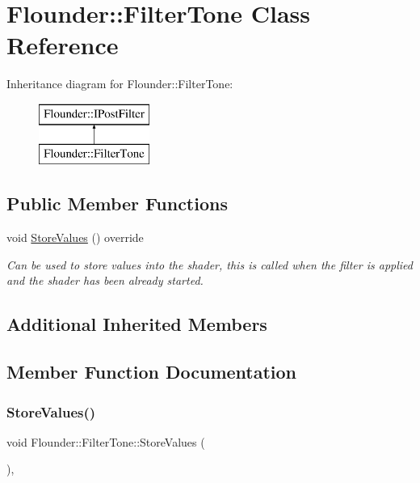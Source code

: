 \hypertarget{class_flounder_1_1_filter_tone}{}\section{Flounder\+:\+:Filter\+Tone Class Reference}
\label{class_flounder_1_1_filter_tone}
Inheritance diagram for Flounder\+:\+:Filter\+Tone\+:\begin{figure}[H]
\begin{center}
\leavevmode
\includegraphics[height=2.000000cm]{class_flounder_1_1_filter_tone}
\end{center}
\end{figure}
\subsection*{Public Member Functions}
\begin{DoxyCompactItemize}
\item 
void \hyperlink{class_flounder_1_1_filter_tone_a384b8c2fd7605bc0cc04be7be9d3eb68}{Store\+Values} () override
\begin{DoxyCompactList}\small\item\em Can be used to store values into the shader, this is called when the filter is applied and the shader has been already started. \end{DoxyCompactList}\end{DoxyCompactItemize}
\subsection*{Additional Inherited Members}


\subsection{Member Function Documentation}
\mbox{\label{class_flounder_1_1_filter_tone_a384b8c2fd7605bc0cc04be7be9d3eb68}} 
\subsubsection{\texorpdfstring{Store\+Values()}{StoreValues()}}
{\footnotesize\ttfamily void Flounder\+::\+Filter\+Tone\+::\+Store\+Values (\begin{DoxyParamCaption}{ }\end{DoxyParamCaption})\hspace{0.3cm}{\ttfamily [override]}, {\ttfamily [virtual]}}



